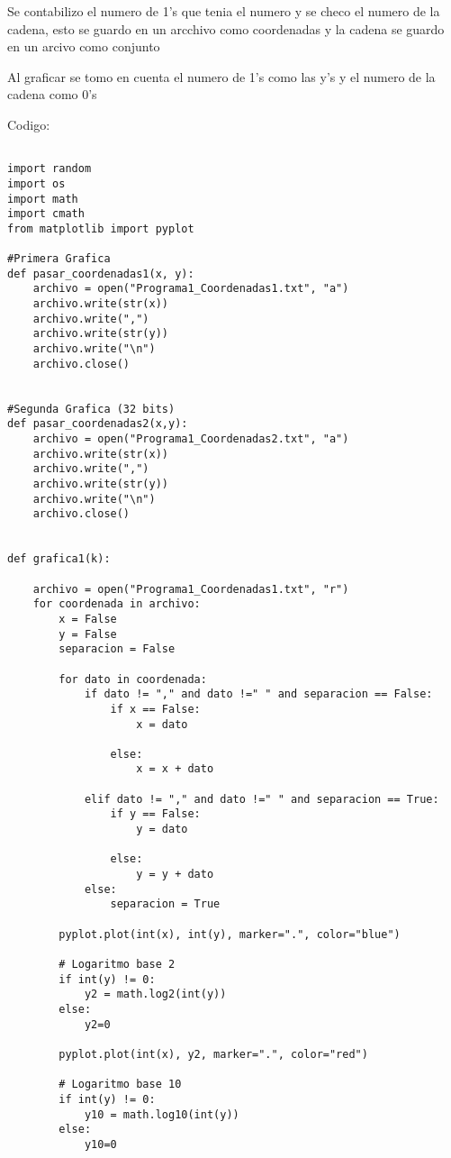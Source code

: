 \documentclass{article}
\begin{document}
\begin{flushleft}
Se contabilizo el numero de 1's que tenia el numero y se checo el numero de la cadena, esto se guardo en un arcchivo como coordenadas y la cadena se guardo en un arcivo como conjunto

Al graficar se tomo en cuenta el numero de 1's como las y's y el numero de la cadena como 0's

Codigo:

\begin{lstlisting}

import random
import os
import math
import cmath
from matplotlib import pyplot

#Primera Grafica
def pasar_coordenadas1(x, y):
    archivo = open("Programa1_Coordenadas1.txt", "a")
    archivo.write(str(x))
    archivo.write(",")
    archivo.write(str(y))
    archivo.write("\n")
    archivo.close()
    

#Segunda Grafica (32 bits)
def pasar_coordenadas2(x,y):
    archivo = open("Programa1_Coordenadas2.txt", "a")
    archivo.write(str(x))
    archivo.write(",")
    archivo.write(str(y))
    archivo.write("\n")
    archivo.close()
    

def grafica1(k):
     
    archivo = open("Programa1_Coordenadas1.txt", "r")
    for coordenada in archivo:
        x = False
        y = False
        separacion = False
        
        for dato in coordenada:
            if dato != "," and dato !=" " and separacion == False:
                if x == False:
                    x = dato
                
                else:
                    x = x + dato
            
            elif dato != "," and dato !=" " and separacion == True:
                if y == False:
                    y = dato
                
                else:
                    y = y + dato
            else:
                separacion = True
                
        pyplot.plot(int(x), int(y), marker=".", color="blue")
        
        # Logaritmo base 2
        if int(y) != 0:
            y2 = math.log2(int(y))
        else:
            y2=0
            
        pyplot.plot(int(x), y2, marker=".", color="red")

        # Logaritmo base 10
        if int(y) != 0:
            y10 = math.log10(int(y))
        else:
            y10=0
            

\end{lstlisting}
\end{flushleft}
\end{document}
